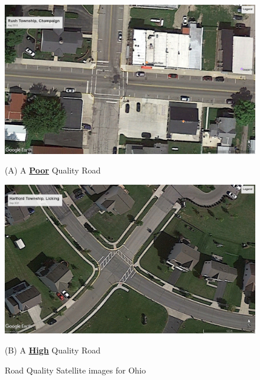 \begin{figure}[ht]
    \centering
    \begin{minipage}{0.59\textwidth}
        \centering
        \includegraphics[width=\textwidth]{images/rush_twp_champaign_aug16.jpg}
        \caption*{(A) A {\bf \underline{Poor}} Quality Road}
    \end{minipage}
    \hspace{0.5in}
    \begin{minipage}{0.59\textwidth}
        \centering
        \includegraphics[width=\textwidth]{images/hartford_twp_licking_sep21.jpg}
        \caption*{(B) A {\bf \underline{High}} Quality Road}
    \end{minipage}
    \caption{Road Quality Satellite images for Ohio}
    \label{fig:road_quality_examples}
\end{figure}


